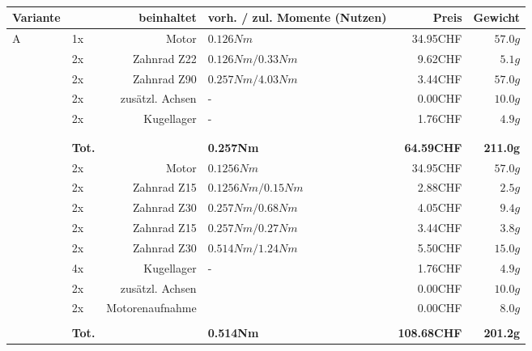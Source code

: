 \\
\begin{figure}[h!]
    \begin{tabular}{p{0.5cm}p{0.8cm}rp{3cm}rr}
    \textbf{Variante} & \multicolumn{2}{r}{\textbf{beinhaltet}} & \textbf{vorh. / zul. Momente (Nutzen)} & \textbf{Preis} & \textbf{Gewicht} \\\hline

    \multirow{9}[2]{*}{A}
          & 1x    & Motor           & $0.126 Nm$           & 34.95CHF & $57.0 g$ \\
          & 2x    & Zahnrad Z22     & $0.126 Nm / 0.33 Nm$ &  9.62CHF & $5.1 g$  \\
          & 2x    & Zahnrad Z90     & $0.257 Nm / 4.03 Nm$ &  3.44CHF & $57.0 g$ \\
          & 2x    & zusätzl. Achsen & -                    &  0.00CHF & $10.0 g$ \\
          & 2x    & Kugellager      & -                    &  1.76CHF & $4.9 g$  \\
          &       &                 &                      &          &  \\
          &       &                 &                      &          &  \\
          & \textbf{Tot.} &  & \textbf{0.257Nm} & \textbf{64.59CHF} & \textbf{211.0g} \\
    \multirow{10}[2]{*}{B} 
          & 2x    & Motor           & $0.1256 Nm$          & 34.95CHF & $57.0 g$ \\
          & 2x    & Zahnrad Z15     & $0.1256 Nm / 0.15 Nm$& 2.88CHF  & $2.5 g$  \\
          & 2x    & Zahnrad Z30     & $0.257 Nm / 0.68 Nm$ & 4.05CHF  & $9.4 g$  \\
          & 2x    & Zahnrad Z15     & $0.257 Nm / 0.27 Nm$ & 3.44CHF  & $3.8 g$  \\
          & 2x    & Zahnrad Z30     & $0.514 Nm / 1.24 Nm$ & 5.50CHF  & $15.0 g$ \\
          & 4x    & Kugellager      & -                    & 1.76CHF  & $4.9 g$  \\
          & 2x    & zusätzl. Achsen &                      & 0.00CHF  & $10.0 g$ \\
          & 2x    & Motorenaufnahme &                      & 0.00CHF  & $8.0 g$  \\
          &       &                 &                      &          &  \\
          & \textbf{Tot.} &       & \textbf{0.514Nm} & \textbf{108.68CHF} & \textbf{201.2g} \\

\end{tabular}
\end{figure}

